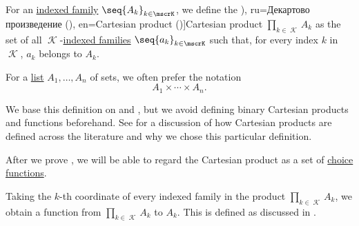 \begin{definition}\label{def:cartesian_product}\mimprovised
  For an \hyperref[def:indexed_family]{indexed family} \( \seq{ A_k }_{k \in \mscrK} \), we define the \term[bg=Декартово произведение (\cite[367]{ГеновМиховскиМоллов1991Алгебра}), ru=Декартово произведение (\cite[11]{Архангельский1988КанторовскаяТеорияМножеств}), en=Cartesian product (\cite[36]{Halmos1960NaiveSetTheory})]{Cartesian product} \( \prod_{k \in \mscrK} A_k \) as the set of all \( \mscrK \)-\hyperref[def:indexed_family]{indexed families} \( \seq{ a_k }_{k \in \mscrK} \) such that, for every index \( k \) in \( \mscrK \), \( a_k \) belongs to \( A_k \).

  For a \hyperref[def:ordered_tuple]{list} \( A_1, \ldots, A_n \) of sets, we often prefer the notation
  \begin{equation*}
    A_1 \times \cdots \times A_n.
  \end{equation*}
\end{definition}
\begin{comments}
  \item We base this definition on \cite[36]{Halmos1960NaiveSetTheory} and \cite[11]{Архангельский1988КанторовскаяТеорияМножеств}, but we avoid defining binary Cartesian products and functions beforehand. See  for a discussion of how Cartesian products are defined across the literature and why we chose this particular definition.

  \item After we prove , we will be able to regard the Cartesian product as a set of \hyperref[def:choice_function]{choice functions}.

  \item Taking the \( k \)-th coordinate of every indexed family in the product \( \prod_{k \in \mscrK} A_k \), we obtain a function from \( \prod_{k \in \mscrK} A_k \) to \( A_k \). This is defined as discussed in .
\end{comments}

